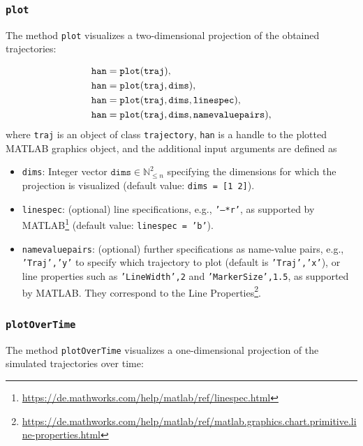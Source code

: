 \subsubsection{\texttt{plot}}

The method \texttt{plot} visualizes a two-dimensional projection of the obtained trajectories:

\begin{equation*}
	\begin{split}
		&\texttt{han} = {\normalfont \texttt{plot}}(\texttt{traj}), \\
		&\texttt{han} = {\normalfont \texttt{plot}}(\texttt{traj},\texttt{dims}), \\
		&\texttt{han} = {\normalfont \texttt{plot}}(\texttt{traj},\texttt{dims},\texttt{linespec}), \\
		&\texttt{han} = {\normalfont \texttt{plot}}(\texttt{traj},\texttt{dims},\texttt{namevaluepairs}),
	\end{split}
\end{equation*}
where \texttt{traj} is an object of class \texttt{trajectory}, \texttt{han} is a handle to the plotted MATLAB graphics object, and the additional input arguments are defined as

\begin{itemize}
	\item \texttt{dims}: Integer vector $\texttt{dims} \in \mathbb{N}_{\leq n}^2$ specifying the dimensions for which the projection is visualized (default value: \texttt{dims = [1 2]}).
	\item \texttt{linespec}: (optional) line specifications, e.g., \texttt{'--*r'}, as supported by MATLAB\footnote{\url{https://de.mathworks.com/help/matlab/ref/linespec.html}} (default value: \texttt{linespec = 'b'}).
	\item \texttt{namevaluepairs}: (optional) further specifications as name-value pairs, e.g., \texttt{'Traj','y'} to specify which trajectory to plot (default is \texttt{'Traj','x'}), or line properties such as
	\texttt{'LineWidth',2} and \texttt{'MarkerSize',1.5}, as supported by MATLAB.
	They correspond to the Line Properties\footnote{\url{https://de.mathworks.com/help/matlab/ref/matlab.graphics.chart.primitive.line-properties.html}}.
\end{itemize}


\subsubsection{\texttt{plotOverTime}}

The method \texttt{plotOverTime} visualizes a one-dimensional projection of the simulated trajectories over time:

